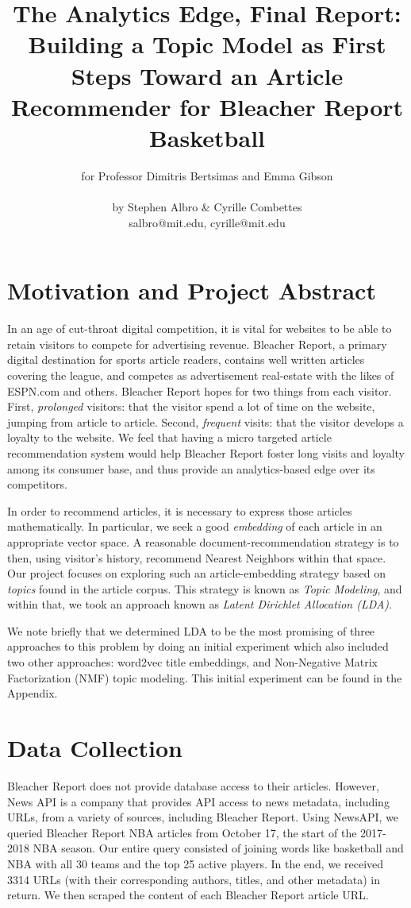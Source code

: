 \documentclass[11pt]{article}
\title{The Analytics Edge, Final Report:\\ Building a Topic Model as First Steps Toward an Article Recommender for Bleacher Report Basketball}
\author{for Professor Dimitris Bertsimas and Emma Gibson \text{ } \\ \\ by Stephen Albro \& Cyrille Combettes \\ salbro@mit.edu, cyrille@mit.edu}
\begin{document}
\maketitle{}


\section{Motivation and Project Abstract}
In an age of cut-throat digital competition, it is vital for websites to be able to retain visitors to compete for advertising revenue. Bleacher Report, a primary digital destination for sports article readers, contains well written articles covering the league, and competes as advertisement real-estate with the likes of ESPN.com and others. Bleacher Report hopes for two things from each visitor. First, \textit{prolonged} visitors: that the visitor spend a lot of time on the website, jumping from article to article.  Second, \textit{frequent} visits: that the visitor develops a loyalty to the website.  We feel that having a micro targeted article recommendation system would help Bleacher Report foster long visits and loyalty among its consumer base, and thus provide an analytics-based edge over its competitors.  

In order to recommend articles, it is necessary to express those articles mathematically. In particular, we seek a good \textit{embedding} of each article in an appropriate vector space.  A reasonable document-recommendation strategy is to then, using visitor's history, recommend Nearest Neighbors within that space. Our project focuses on exploring such an article-embedding strategy based on \textit{topics} found in the article corpus. This strategy is known as \textit{Topic Modeling}, and within that, we took an approach known as \textit{Latent Dirichlet Allocation (LDA)}.  

We note briefly that we determined LDA to be the most promising of three approaches to this problem by doing an initial experiment which also included two other approaches: word2vec title embeddings, and Non-Negative Matrix Factorization (NMF) topic modeling. This initial experiment can be found in the Appendix.

\section{Data Collection}
Bleacher Report does not provide database access to their articles.  However, News API is a company that provides API access to news metadata, including URLs, from a variety of sources, including Bleacher Report.  Using NewsAPI, we queried Bleacher Report NBA articles from October 17, the start of the 2017-2018 NBA season. Our entire query consisted of joining words like basketball and NBA with all 30 teams and the top 25 active players.  In the end, we received 3314 URLs (with their corresponding authors, titles, and other metadata) in return.  We then scraped the content of each Bleacher Report article URL. 
\end{document}
